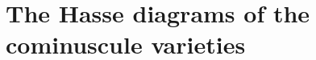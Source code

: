 \documentclass[a4paper,10pt]{amsart}
\theoremstyle{remark}
\begin{document}
\section{The Hasse diagrams of the cominuscule varieties}%
\begingroup
\tikzset{/Dynkin diagram/ordering=Carter}
\newcommand{\hasseEntry}[1]%
{%
	&%
	\multicolumn{3}%
	{%
		>{\columncolor[gray]{.96}\centering\arraybackslash}%
		m{\hasseEntryWidth}%
	}%
	{%
		\begin{tikzpicture}[%
			background rectangle/.style={},%
			background top/.style={%
				draw=black,%
				opacity=0,%
				line width=1ex},%
			framed,%
			show background top]%
		\hasse[three D=false]#1%
		\end{tikzpicture}%
	}%
}%
\small%
\setlength{\tabcolsep}{4pt}%
\setlength{\extrarowheight}{0pt}%
\newlength{\hasseEntryWidth}%
\setlength{\hasseEntryWidth}{11cm}%
\addtolength{\hasseEntryWidth}{16pt}%
\end{document}
